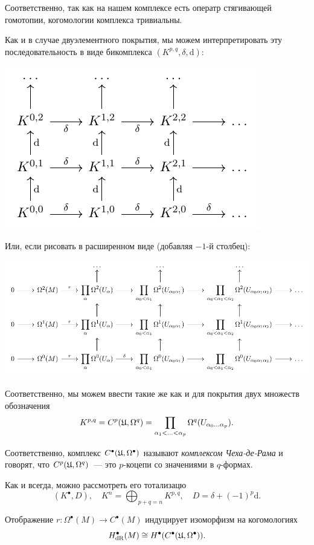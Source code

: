 	 Соответственно, так как на нашем комплексе есть оператр стягивающей гомотопии, когомологии комплекса тривиальны. 

	 Как и в случае двуэлементного покрытия, мы можем интерпретировать эту последовательность в виде бикомплекса $(K^{p, q}, \delta, \mathrm{d})$:

	 \begin{center}
	 	\includegraphics{lectures/7/pictures/cd_36.pdf}
	 \end{center}
	 Или, если рисовать в расширенном виде (добавляя $-1$-й столбец):

	 \begin{center}
	 	\includegraphics{lectures/7/pictures/cd_37.pdf}
	 \end{center}

	 Соответственно, мы можем ввести такие же как и для покрытия двух множеств обозначения 
	 \[
	 	K^{p, q} = C^{p}(\mathfrak{U}, \Omega^{q}) = \prod_{\alpha_1 < \ldots < \alpha_p} \Omega^q(U_{\alpha_0 \ldots \alpha_p}).
	 \]

	 Соответственно, комплекс $C^{\bullet}(\mathfrak{U}, \Omega^{\bullet})$ называют \emph{комплексом Чеха-де-Рама} и говорят, что $C^{p}(\mathfrak{U}, \Omega^{q})$~--- это $p$-коцепи со значениями в $q$-формах. 

	 Как и всегда, можно рассмотреть его тотализацю
	 \[
	 	(K^{\bullet}, D), \quad K^{n} = \bigoplus_{p + q = n} K^{p, q}, \quad D = \delta + (-1)^p \mathrm{d}.  
	 \]
	 \begin{statement}\label{gen_mayer_vietoris_principle} 
	 	Отображение $r\colon \Omega^{\bullet}(M) \to C^{\bullet}(M)$ индуцирует изоморфизм на когомологиях
	 	\[
	 	  	H^{\bullet}_{\operatorname{dR}}(M) \cong H^{\bullet}(C^{\bullet}(\mathfrak{U}, \Omega^{\bullet})).
	 	  \]  
	 \end{statement}

